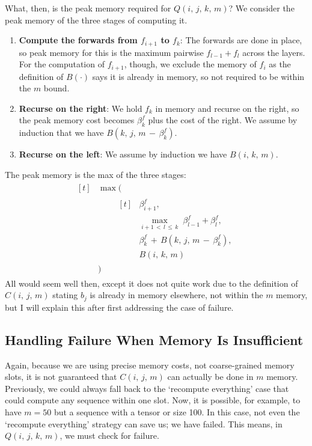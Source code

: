 What, then, is the peak memory required for \(Q(i,\,j,\,k,\,m)\)?
We consider the peak memory of the three stages of computing it.
\begin{enumerate}
    \item \textbf{Compute the forwards from \(f_{i+1}\) to \(f_k\)}:
    The forwards are done in place, so peak memory for this is the maximum pairwise \(f_{l-1}+f_l\) across the layers.
    For the computation of \(f_{i+1}\), though, we exclude the memory of \(f_i\) as the definition of \(B(\cdot)\) says it is already in memory, so not required to be within the \(m\) bound.
    \item \textbf{Recurse on the right}: We hold \(f_k\) in memory and recurse on the right, so the peak memory cost becomes \(\beta^f_k\) plus the cost of the right.
    We assume by induction that we have \(B(k,\, j,\, m\,-\,\beta^f_k)\).
    \item \textbf{Recurse on the left}: We assume by induction we have \(B(i,\,k,\,m)\).
\end{enumerate}
The peak memory is the max of the three stages:
\begin{align} \label{eqn:3-b-k-1}
\begin{aligned}[t] %
    &\max(\\[0.5em]
    &\qquad\begin{aligned}[t]
        &\beta^f_{i+1}, \\[0.5em]
        &\max_{i+1 \,<\, l \,\leq\, k}\; \beta^f_{l-1} + \beta^f_l, \\[0.5em]
        &\beta^f_k \,+\, B(k,\, j,\, m\,-\,\beta^f_k), \\[0.5em]
        &B(i,\,k,\,m)
    \end{aligned} \\[0.5em]
    &)
\end{aligned}
\end{align}
All would seem well then, except it does not quite work due to the definition of \(C(i,\,j,\,m)\) stating \(b_j\) is already in memory elsewhere, not within the \(m\) memory, but I will explain this after first addressing the case of failure.

\subsection{Handling Failure When Memory Is Insufficient}
Again, because we are using precise memory costs, not coarse-grained memory slots, it is not guaranteed that \(C(i,\,j,\,m)\) can actually be done in \(m\) memory.
Previously, we could always fall back to the `recompute everything' case that could compute any sequence within one slot.
Now, it is possible, for example, to have \(m=50\) but a sequence with a tensor or size 100.
In this case, not even the `recompute everything' strategy can save us; we have failed.
This means, in \(Q(i,\,j,\,k,\,m)\), we must check for failure.

